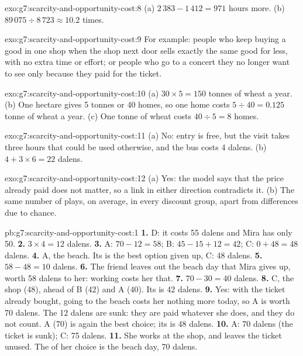 \begin{solution}{exo:g7:scarcity-and-opportunity-cost:8}
(a) $2\,383 - 1\,412 = 971$ hours more. (b) $89\,075 \div 8\,723 \approx 10.2$ times.
\end{solution}

\begin{solution}{exo:g7:scarcity-and-opportunity-cost:9}
For example: people who keep buying a good in one shop when the shop next door sells
exactly the same good for less, with no extra time or effort; or people who go to a
concert they no longer want to see only because they paid for the ticket.
\end{solution}

\begin{solution}{exo:g7:scarcity-and-opportunity-cost:10}
(a) $30 \times 5 = 150$ tonnes of wheat a year. (b) One hectare gives 5 tonnes or 40
homes, so one home costs $5 \div 40 = 0.125$ tonne of wheat a year. (c) One tonne of
wheat costs $40 \div 5 = 8$ homes.
\end{solution}

\begin{solution}{exo:g7:scarcity-and-opportunity-cost:11}
(a) No: entry is free, but the visit takes three hours that could be used otherwise,
and the bus costs 4 dalens. (b) $4 + 3 \times 6 = 22$ dalens.
\end{solution}

\begin{solution}{exo:g7:scarcity-and-opportunity-cost:12}
(a) Yes: the model says that the price already paid does not matter, so a link in
either direction contradicts it. (b) The same number of plays, on average, in every
discount group, apart from differences due to chance.
\end{solution}

\begin{solution}{pb:g7:scarcity-and-opportunity-cost:1}
\textbf{1.} D: it costs 55 dalens and Mira has only 50.
\textbf{2.} $3 \times 4 = 12$ dalens.
\textbf{3.} A: $70 - 12 = 58$; B: $45 - 15 + 12 = 42$; C: $0 + 48 = 48$ dalens.
\textbf{4.} A, the beach. Its  is the best option given up, C: 48
dalens.
\textbf{5.} $58 - 48 = 10$ dalens.
\textbf{6.} The friend leaves out the beach day that Mira gives up, worth 58 dalens to
her: working costs her that.
\textbf{7.} $70 - 30 = 40$ dalens.
\textbf{8.} C, the shop (48), ahead of B (42) and A (40). Its  is 42
dalens.
\textbf{9.} Yes: with the ticket already bought, going to the beach costs her nothing
more today, so A is worth 70 dalens. The 12 dalens are sunk: they are paid whatever
she does, and they do not count. A (70) is again the best choice; its 
is 48 dalens.
\textbf{10.} A: 70 dalens (the ticket is sunk); C: 75 dalens.
\textbf{11.} She works at the shop, and leaves the ticket unused. The 
of her choice is the beach day, 70 dalens.
\end{solution}
